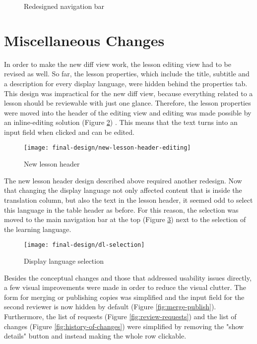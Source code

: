\begin{figure}[h!]
 \centering
 \caption{Redesigned navigation bar}
 \label{fig:redesigned-nav}
\end{figure}

\section{Miscellaneous Changes}
In order to make the new diff view work, the lesson editing view had to be revised as well. So far, the lesson properties, which include the title, subtitle and a description for every display language, were hidden behind the properties tab. This design was impractical for the new diff view, because everything related to a lesson should be reviewable with just one glance. Therefore, the lesson properties were moved into the header of the editing view and editing was made possible by an inline-editing solution (Figure \ref{fig:new-lesson-header}) \cite{_inplace_????}. This means that the text turns into an input field when clicked and can be edited. 

\begin{figure}[h!]
 \centering
 \texttt{[image: final-design/new-lesson-header-editing]}
 \caption{New lesson header}
 \label{fig:new-lesson-header}
\end{figure}

The new lesson header design described above required another redesign. Now that changing the display language not only affected content that is inside the translation column, but also the text in the lesson header, it seemed odd to select this language in the table header as before. For this reason, the selection was moved to the main navigation bar at the top (Figure \ref{fig:dl-selection}) next to the selection of the learning language.

\begin{figure}[h!]
 \centering
 \texttt{[image: final-design/dl-selection]}
 \caption{Display language selection}
 \label{fig:dl-selection}
\end{figure}

Besides the conceptual changes and those that addressed usability issues directly, a few visual improvements were made in order to reduce the visual clutter. The form for merging or publishing copies was simplified and the input field for the second reviewer is now hidden by default (Figure \ref{fig:merge-publish}). Furthermore, the list of requests (Figure \ref{fig:review-requests}) and the list of changes (Figure \ref{fig:history-of-changes}) were simplified by removing the "show details" button and instead making the whole row clickable. 

